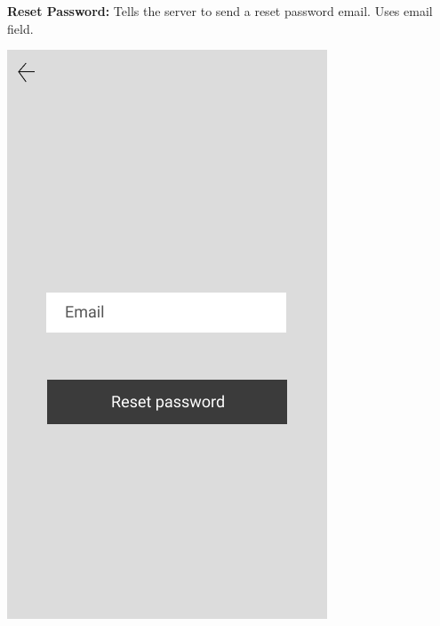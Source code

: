 \documentclass{scrreprt}
\begin{document}
\textbf{Reset Password:}
Tells the server to send a reset password email.  Uses email field.
\begin{center}
\includegraphics[scale=0.4]{resetpass.png}
\end{center}
\end{document}
